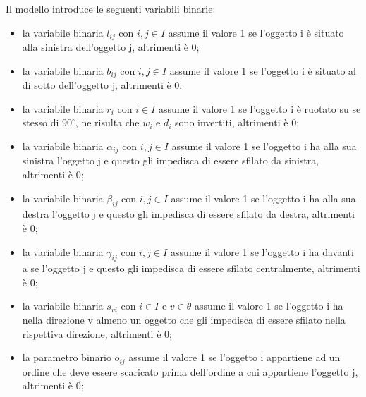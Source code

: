 Il modello introduce le seguenti variabili binarie:
\begin{itemize}
	\item la variabile binaria $l_{ij}$ con $i,j \in I$ assume il valore 1 se l'oggetto i è situato alla sinistra dell'oggetto j, altrimenti è 0;
	\item la variabile binaria $b_{ij}$ con $i,j \in I$ assume il valore 1 se l'oggetto i è situato al di sotto dell'oggetto j, altrimenti è 0.
	\item la variabile binaria $r_{i}$ con $i \in I$ assume il valore 1 se l'oggetto i è ruotato su se stesso di $90^{\circ}$, ne risulta che $w_{i}$ e $d_{i}$ sono invertiti, altrimenti è 0;
	\item la variabile binaria $\alpha_{ij}$ con $i,j \in I$ assume il valore 1 se l'oggetto i ha alla sua sinistra l'oggetto j e questo gli impedisca di essere sfilato da sinistra, altrimenti è 0;
	\item la variabile binaria $\beta_{ij}$ con $i,j \in I$ assume il valore 1 se l'oggetto i ha alla sua destra l'oggetto j e questo gli impedisca di essere sfilato da destra, altrimenti è 0;
	\item la variabile binaria $\gamma_{ij}$ con $i,j \in I$ assume il valore 1 se l'oggetto i ha davanti a se l'oggetto j e questo gli impedisca di essere sfilato centralmente, altrimenti è 0;
	\item la variabile binaria $s_{vi}$ con $i \in I$ e $v \in \theta$ assume il valore 1 se l'oggetto i ha nella direzione v almeno un oggetto che gli impedisca di essere sfilato nella rispettiva direzione, altrimenti è 0;
	\item la parametro binario $o_{ij}$ assume il valore 1 se l'oggetto i appartiene ad un ordine che deve essere scaricato prima dell'ordine a cui appartiene l'oggetto j, altrimenti è 0;
\end{itemize}

